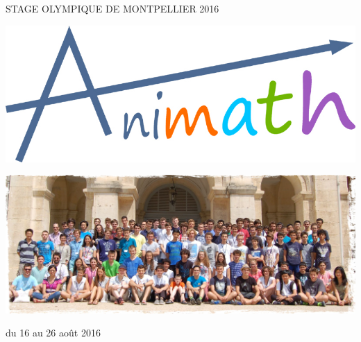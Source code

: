 

\begin{center}\LARGE{\textsc{STAGE OLYMPIQUE DE MONTPELLIER 2016}}
\vrule depth 0pt height 0.4pt width 16cm\end{center}



\begin{center}\includegraphics[scale=0.3]{logos/animath.jpg}
\end{center}



\begin{center}\includegraphics[width=18cm]{groupe.jpg}
\end{center}


\begin{center}\large{du 16 au 26 août 2016}\end{center}





